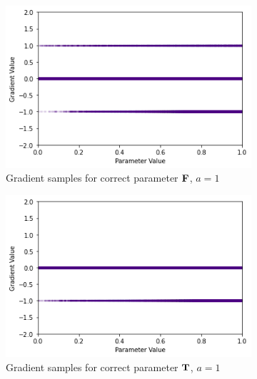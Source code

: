 \begin{figure}[ht]
    \centering
    \begin{subfigure}[b]{0.47\textwidth}
        \centering
        \includegraphics[width=\textwidth]{imgs/grad_min_1_falseparam.png}
        \caption{Gradient samples for correct parameter $\textbf{F}$, $a=1$}
        \label{fig:conjgrad10falsem}
    \end{subfigure}
    \begin{subfigure}[b]{0.47\textwidth}
        \centering
        \includegraphics[width=\textwidth]{imgs/grad_min_1_trueparam.png}
        \caption{Gradient samples for correct parameter $\textbf{T}$, $a=1$}
        \label{fig:conjgrad10truem}
    \end{subfigure}
    \begin{subfigure}[b]{0.47\textwidth}
        \centering

\end{subfigure}
\end{figure}
